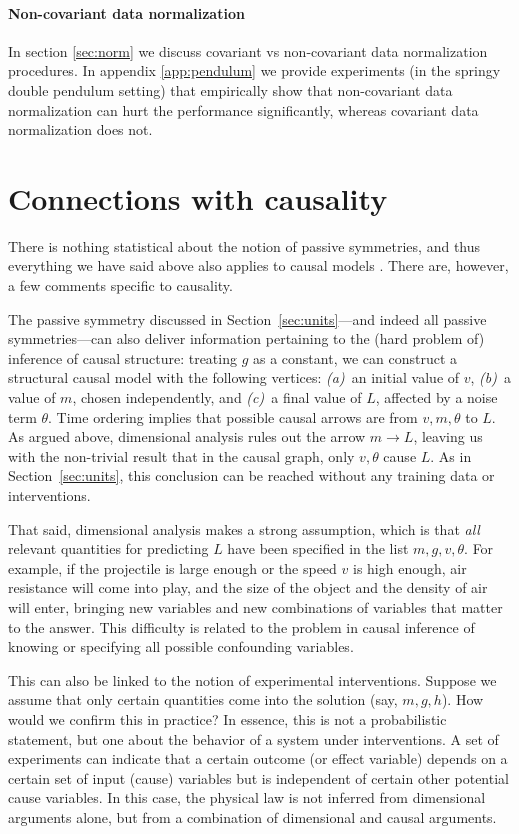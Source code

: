 \documentclass[accepted]{article}
\newcommand{\sectionname}{Section}
\newcommand{\secref}[1]{\sectionname~\ref{#1}}
\begin{document}
\paragraph{Non-covariant data normalization} In section \ref{sec:norm} we discuss covariant vs non-covariant data normalization procedures. In appendix \ref{app:pendulum} we provide experiments (in the springy double pendulum setting) that empirically show that non-covariant data normalization can hurt the performance significantly, whereas covariant data normalization does not.

\section{Connections with causality}\label{sec:causality}
There is nothing statistical about the notion of passive symmetries, and thus everything we have said above also applies to causal models \citep{PetJanSch17}.
There are, however, a few comments specific to causality.

The passive symmetry discussed in \secref{sec:units}---and indeed all passive symmetries---can also deliver information pertaining to the (hard problem of) inference of causal structure:
treating $g$ as a constant, we can construct a structural causal model with the following vertices: \textsl{(a)}~an initial value of $v$, \textsl{(b)}~a value of $m$, chosen independently, and \textsl{(c)}~a final value of $L$, affected by a noise term $\theta$.
Time ordering implies that possible causal arrows are from $v, m, \theta$ to $L$.
As argued above, dimensional analysis rules out the arrow $m\to L$, leaving us with the non-trivial result that in the causal graph, only $v,\theta$ cause $L$.
As in \secref{sec:units}, this conclusion can be reached without any training data or interventions.

That said, dimensional analysis makes a strong assumption, which is that \emph{all} relevant quantities for predicting $L$ have been specified in the list $m, g, v, \theta$.
For example, if the projectile is large enough or the speed $v$ is high enough, air resistance will come into play, and the size of the object and the density of air will enter, bringing new variables and new combinations of variables that matter to the answer.
This difficulty is related to the problem in causal inference of knowing or specifying all possible confounding variables.

This can also be linked to the notion of experimental interventions. Suppose we assume that only certain quantities come into the solution (say, $m, g, h$). How would we confirm this in practice? In essence, this is not a probabilistic statement, but one about the behavior of a system under interventions. A set of experiments can indicate that a certain outcome (or effect variable) depends on a certain set of input (cause) variables but is independent of certain other potential cause variables. In this case, the physical law is not inferred from dimensional arguments alone, but from a combination of dimensional and causal arguments.
\end{document}
